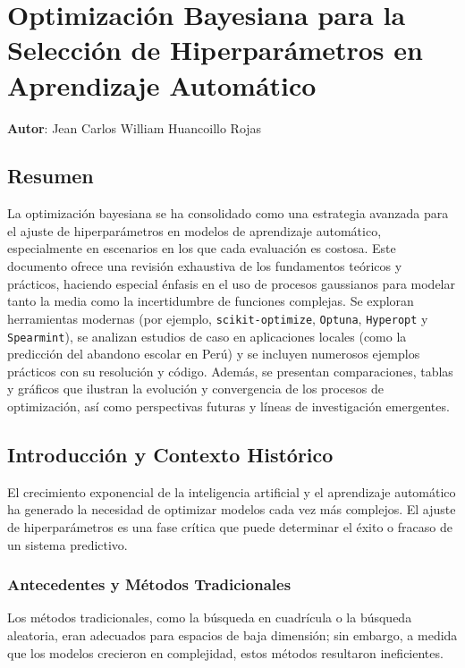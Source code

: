\documentclass[12pt]{article}
\begin{document}
	
	\chapter{Optimización Bayesiana para la Selección de Hiperparámetros en Aprendizaje Automático}
	\textbf{Autor}: \large{Jean Carlos William Huancoillo Rojas}
	\label{chap:7}
	
	\vspace{1cm} 
	
	\section*{Resumen}
	La optimización bayesiana se ha consolidado como una estrategia avanzada para el ajuste de hiperparámetros en modelos de aprendizaje automático, especialmente en escenarios en los que cada evaluación es costosa. Este documento ofrece una revisión exhaustiva de los fundamentos teóricos y prácticos, haciendo especial énfasis en el uso de procesos gaussianos para modelar tanto la media como la incertidumbre de funciones complejas. Se exploran herramientas modernas (por ejemplo, \texttt{scikit-optimize}, \texttt{Optuna}, \texttt{Hyperopt} y \texttt{Spearmint}), se analizan estudios de caso en aplicaciones locales (como la predicción del abandono escolar en Perú) y se incluyen numerosos ejemplos prácticos con su resolución y código. Además, se presentan comparaciones, tablas y gráficos que ilustran la evolución y convergencia de los procesos de optimización, así como perspectivas futuras y líneas de investigación emergentes.
	

	\section{Introducción y Contexto Histórico}
	El crecimiento exponencial de la inteligencia artificial y el aprendizaje automático ha generado la necesidad de optimizar modelos cada vez más complejos. El ajuste de hiperparámetros es una fase crítica que puede determinar el éxito o fracaso de un sistema predictivo.
	
	\subsection{Antecedentes y Métodos Tradicionales}
	Los métodos tradicionales, como la búsqueda en cuadrícula o la búsqueda aleatoria, eran adecuados para espacios de baja dimensión; sin embargo, a medida que los modelos crecieron en complejidad, estos métodos resultaron ineficientes.  
	\lipsum[1-2]
	
\end{document}
